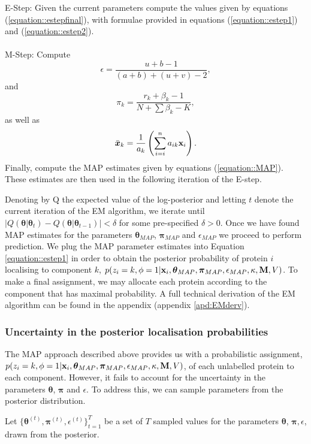 \documentclass[12pt,english]{article}\usepackage[]{graphicx}\usepackage[]{color}
\begin{document}
E-Step: Given the current parameters compute the values given by equations (\ref{equation::estepfinal}),
with formulae provided in equations (\ref{equation::estep1}) and (\ref{equation::estep2}).
\\
\\
M-Step:
Compute
\[\epsilon = \frac{ u + b - 1}{(a+b) + (u+v) - 2},\]
and
\[\pi_k = \frac{r_k + \beta_k - 1}{N + \sum \beta_k - K},\]
as well as
\[\bar{\boldsymbol{x}}_k = \frac{1}{a_k}\left(\sum_{i=i}^{n}a_{ik}{\bf x}_i\right).\]
Finally, compute the MAP estimates given by equations (\ref{equation::MAP}). These estimates are then used in the following iteration of the E-step.


Denoting by Q the expected value of the log-posterior and letting $t$ denote the current iteration of the EM algorithm, we iterate
until $\lvert Q(\boldsymbol{\theta}|\boldsymbol{\theta}_{t}) - Q(\boldsymbol{\theta}|\boldsymbol{\theta}_{t-1})\rvert < \delta$ for some pre-specified $\delta >0$.
Once we have found MAP estimates for the parameters
$\boldsymbol{\theta}_{MAP}$, $\boldsymbol{\pi}_{MAP}$ and $\epsilon_{MAP}$ we proceed to perform prediction. We plug the MAP parameter estimates into Equation \eqref{equation::estep1} in order to obtain the posterior probability of protein $i$ localising to component $k$, $p(z_i = k, \phi = 1 | {\bf x}_i, \boldsymbol{\theta}_{MAP}, \boldsymbol{\pi}_{MAP} , \epsilon_{MAP},\kappa, {\bf M}, V)$. To make a final assignment, we may allocate each protein according to the component that has maximal probability.
A full technical derivation of the EM algorithm can be found in the appendix (appendix \ref{apd:EMderv}).

\subsubsection{Uncertainty in the posterior localisation probabilities}\label{section::MCMC}
The MAP approach described above provides us with a probabilistic assignment, $p(z_i = k, \phi = 1 | {\bf x}_i, \boldsymbol{\theta}_{MAP}, \boldsymbol{\pi}_{MAP} , \epsilon_{MAP},\kappa, {\bf M}, V)$, of each unlabelled protein to each component.  However, it fails to account for the uncertainty in the parameters $\boldsymbol{\theta}$, $\boldsymbol{\pi}$ and $\epsilon$. To address this, we can sample parameters from the posterior distribution.

Let $\{\boldsymbol{\theta}^{(t)},  \boldsymbol{\pi}^{(t)}, \epsilon^{(t)}\}_{t=1}^T$ be a set of $T$ sampled values for the parameters $\boldsymbol{\theta}$, $\boldsymbol{\pi}, \epsilon$, drawn from the posterior.
\end{document}
